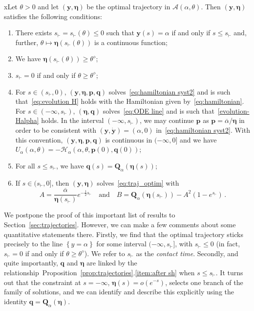 \documentclass[AHL,Unicode,longabstracts]{cedram}
\newcommand{\bp}{\mathbf{p}}
\newcommand{\bq}{\mathbf{q}}
\newcommand{\bQ}{\mathbf{Q}}
\newcommand{\by}{\mathbf{y}}
\newcommand{\bA}{\mathscr{A}}
\newcommand{\bH}{\mathscr{H}}
\newcommand{\beeta}{\boldsymbol{\eta}}
\newcommand{\1}{\mathds{1}}
\newcommand{\Thetastar}{\theta^{\diamond}}
\newcommand{\shh}{s_{\vdash}}
\newcommand*{\romanenumi}{\renewcommand*{\theenumi}{\roman{enumi}}}
\begin{document}
\begin{prop}\label{prop:trajectories}
xLet $\theta> 0$ and let $(\by,\beeta)$ be the optimal trajectory in $\bA(\alpha,\theta)$. Then $(\by,\beeta)$ satisfies the following conditions:
\begin{enumerate}\romanenumi
\item \label{item:sh}
There exists $\shh = \shh(\theta)\leq 0$ such that $\by(s) = \alpha$ if and only if $s \leq \shh$ and, further, $\theta\mapsto \beeta\left (\shh(\theta)\right)$ is a continuous function;
\item \label{item:Q}
We have $\beeta(\shh(\theta)) \geq \Thetastar$;
\item \label{item:sh=0}
$\shh = 0$ if and only if $\theta \geq \Thetastar$;
\item \label{item:continuous}
For $s \in (\shh,0)$, $(\by,\beeta,\bp,\bq)$ solves~\eqref{eq:hamiltonian syst2} and is such that~\eqref{eq:evolution H} holds with the Hamiltonian given by~\eqref{eq:hamiltonian}. For $s \in (-\infty,\shh)$, $(\beeta, \bq)$ solves~\eqref{eq:ODE line} and is such that~\eqref{evolution-Halpha} holds. In the interval $(-\infty,\shh)$, we may continue $\bp$ as $\bp=\overline{\alpha}/ \beeta$ in order to be consistent with $(\by,\dot{\by})=(\alpha,0)$ in~\eqref{eq:hamiltonian syst2}. With this convention, $(\by,\beeta,\bp,\bq)$ is continuous in $(-\infty,0]$ and we have $U_\alpha(\alpha,\theta) = - \bH_\alpha(\alpha,\theta,\bp(0),\bq(0))$;
\item \label{item:after sh}
For all $s\leq \shh$, we have $\bq(s) = \bQ_\alpha(\beeta(s))$;
\item \label{item:A,B}
If $s \in (\shh,0]$, then $(\by,\beeta)$ solves~\eqref{eq:traj_optim} with
\begin{equation*}
A = \dfrac{\overline\alpha}{\beeta(\shh)} e^{-\frac 1 2\shh}\quad \text{and}\quad B = \bQ_\alpha(\beeta(\shh)) - A^2\left (1-e^{\shh}\right)\,.
\end{equation*}
\end{enumerate}
\end{prop}

We postpone the proof of this important list of results to Section~\ref{sec:trajectories}. However, we can make a few comments about some quantitative statements there. Firstly, we find that the optimal trajectory sticks precisely to the line $\left\{y = \alpha\right\}$ for some interval $(-\infty, \shh]$, with $\shh\leq 0$ (in fact, $\shh = 0$ if and only if $\theta \geq \Thetastar$). We refer to $\shh$ as the {\em contact time}. Secondly, and quite importantly, $\bq$ and $\beeta$ are linked by the relationship~Proposition~\ref{prop:trajectories}.\eqref{item:after sh} when $s\leq \shh$. It turns out that the constraint at $s = -\infty$, $\beeta(s) = o(e^{-s})$, selects one branch of the family of solutions, and we can identify and describe this explicitly using the identity $\bq = \bQ_\alpha(\beeta)$.
\end{document}
